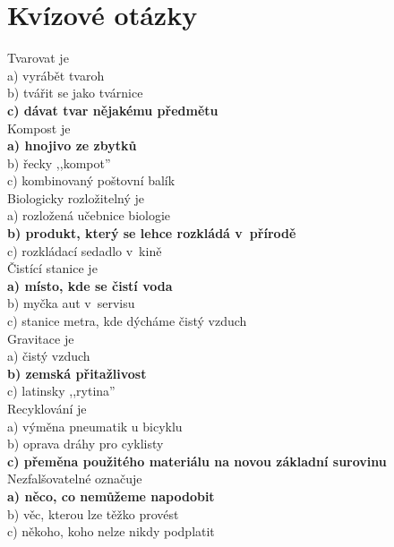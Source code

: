 
\section{Kvízové otázky}
\begin{multicols}{4}

\noindent
Tvarovat je\\
a) vyrábět tvaroh\\
b) tvářit se jako tvárnice\\
\textbf{c) dávat tvar nějakému předmětu}\\

\noindent
Kompost je\\
\textbf{a) hnojivo ze zbytků}\\
b) řecky ,,kompot''\\
c) kombinovaný poštovní balík\\

\noindent
Biologicky rozložitelný je\\
a) rozložená učebnice biologie\\
\textbf{b) produkt, který se lehce rozkládá v~přírodě}\\
c) rozkládací sedadlo v~kině\\

\noindent
Čistící stanice je\\
\textbf{a) místo, kde se čistí voda}\\
b) myčka aut v~servisu\\
c) stanice metra, kde dýcháme čistý vzduch\\

\noindent
Gravitace je\\
a) čistý vzduch\\
\textbf{b) zemská přitažlivost}\\
c) latinsky ,,rytina''\\

\noindent
Recyklování je\\
a) výměna pneumatik u bicyklu\\
b) oprava dráhy pro cyklisty\\
\textbf{c) přeměna použitého materiálu na novou základní surovinu}\\

\noindent
Nezfalšovatelné označuje\\
\textbf{a) něco, co nemůžeme napodobit}\\
b) věc, kterou lze těžko provést\\
c) někoho, koho nelze nikdy podplatit\\


\end{multicols}
